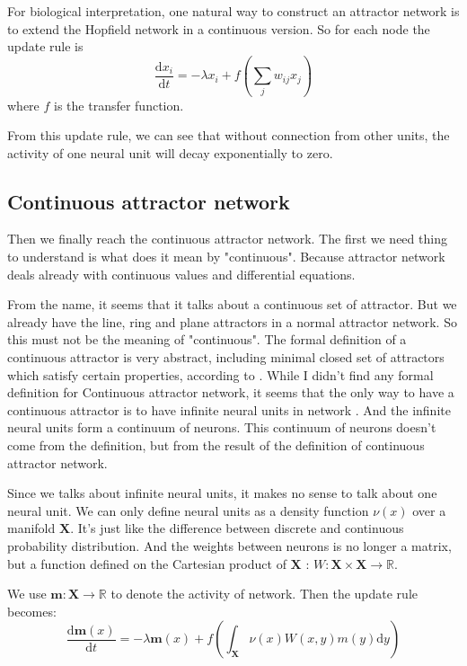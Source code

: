 \documentclass{article}
\begin{document}
	For biological interpretation, one natural way to construct an attractor network is to extend the Hopfield network in a continuous version. So for each node the update rule is
	\begin{equation}
	\frac{\mathrm{d}x_i}{\mathrm{d}t} = -\lambda x_i + f(\sum_j w_{ij} x_j)
	\end{equation}
	where $f$ is the transfer function.
	
	From this update rule, we can see that without connection from other units, the activity of one neural unit will decay exponentially to zero.
	
	\subsection{Continuous attractor network}
	Then we finally reach the continuous attractor network. The first we need thing to understand is what does it mean by "continuous". Because attractor network deals already with continuous values and differential equations.
	
	From the name, it seems that it talks about a continuous set of attractor. But we already have the line, ring and plane attractors in a normal attractor network. So this must not be the meaning of "continuous". The formal definition of a continuous attractor is very abstract, including minimal closed set of attractors which satisfy certain properties, according to \cite{CANN}. While I didn't find any formal definition for Continuous attractor network, it seems that the only way to have a continuous attractor is to have infinite neural units in network \cite{trappenberg2003continuous}. And the infinite neural units form a continuum of neurons. This continuum of neurons doesn't come from the definition, but from the result of the definition of continuous attractor network.
	
	Since we talks about infinite neural units, it makes no sense to talk about one neural unit. We can only define neural units as a density function $\nu(x)$ over a manifold $\mathbf{X}$. It's just like the difference between discrete and continuous probability distribution. And the weights between neurons is no longer a matrix, but a function defined on the Cartesian product of $\mathbf{X}$ : $W:\mathbf{X}\times \mathbf{X} \rightarrow \mathbb{R} $. 
	
	We use $\mathbf{m}:\mathbf{X}\rightarrow\mathbb{R}$ to denote the activity of network. Then the update rule becomes:
	\begin{equation}
	\frac{\mathrm{d}\mathbf{m}(x)}{\mathrm{d}t} = -\lambda \mathbf{m}(x) + f(\int_{\mathbf{X}}\nu(x)W(x,y)m(y)\mathrm{d}y)
	\end{equation}
	
\end{document}

